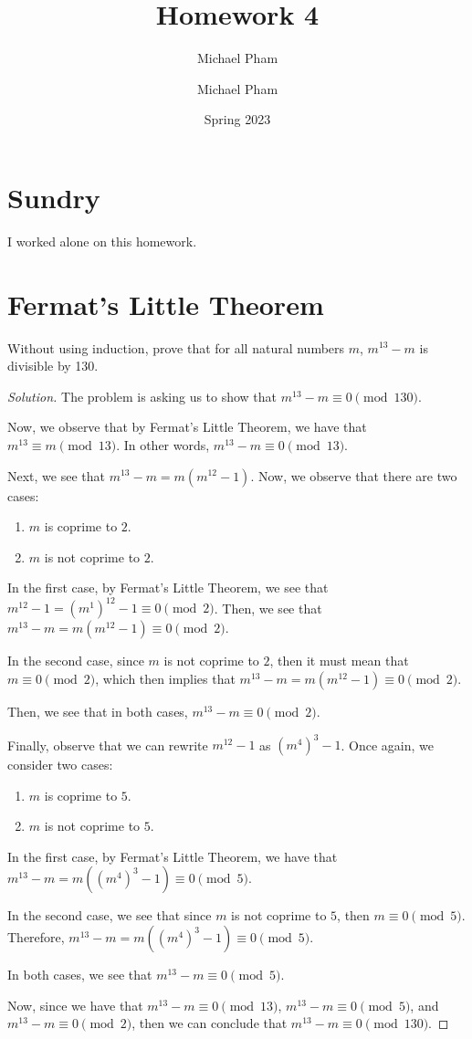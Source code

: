 \documentclass{article}
\title{#1}
\author{Michael Pham}
\date{#2}
\newenvironment{solution}{\begin{proof}[Solution]}{\end{proof}}
\newcommand{\mytitle}[2]{%
	\title{#1}
	\author{Michael Pham}
	\date{#2}
	\maketitle
	\newpage
	\tableofcontents
	\newpage
}
\begin{document}
\mytitle{Homework 4}{Spring 2023}
\setcounter{section}{-1}
\section{Sundry}
I worked alone on this homework.
	
\newpage

\section{Fermat's Little Theorem}
\begin{hw}
	Without using induction, prove that for all natural numbers $m$, $m^{13} - m$ is divisible by 130.
\end{hw}
\begin{solution}
	The problem is asking us to show that $m^{13} - m \equiv 0 \pmod{130}$.
	
	Now, we observe that by Fermat's Little Theorem, we have that $m^{13} \equiv m \pmod{13}$. In other words, $m^{13} - m \equiv 0 \pmod{13}$.
	
	Next, we see that $m^{13} - m = m(m^{12} - 1)$. Now, we observe that there are two cases:
	\begin{enumerate}
		\item $m$ is coprime to $2$.
		\item $m$ is not coprime to $2$.
	\end{enumerate}

	In the first case, by Fermat's Little Theorem, we see that $m^{12} - 1 = (m^{1})^{12} - 1 \equiv 0 \pmod{2}$. Then, we see that $m^{13} - m = m(m^{12} - 1) \equiv 0 \pmod{2}$.
	
	In the second case, since $m$ is not coprime to $2$, then it must mean that $m \equiv 0 \pmod{2}$, which then implies that $m^{13} - m = m(m^{12} - 1) \equiv 0 \pmod{2}$.
	
	Then, we see that in both cases, $m^{13} - m \equiv 0 \pmod{2}$.
	
	Finally, observe that we can rewrite $m^{12} - 1$ as $(m^{4})^{3} - 1$. Once again, we consider two cases:
	\begin{enumerate}
		\item $m$ is coprime to $5$.
		\item $m$ is not coprime to $5$.
	\end{enumerate}

	In the first case, by Fermat's Little Theorem, we have that $m^{13}-m = m((m^{4})^{3} - 1) \equiv 0 \pmod{5}$.
	
	In the second case, we see that since $m$ is not coprime to $5$, then $m \equiv 0 \pmod{5}$. Therefore, $m^{13} - m = m\left( (m^{4})^{3} - 1 \right) \equiv 0 \pmod{5}$.
	
	In both cases, we see that $m^{13} - m \equiv 0 \pmod{5}$.
	
	Now, since we have that $m^{13} - m \equiv 0 \pmod{13}$, $m^{13}-m \equiv 0 \pmod{5}$, and $m^{13}-m \equiv 0 \pmod{2}$, then we can conclude that $m^{13} - m \equiv 0 \pmod{130}$.
\end{solution}
\end{document}
